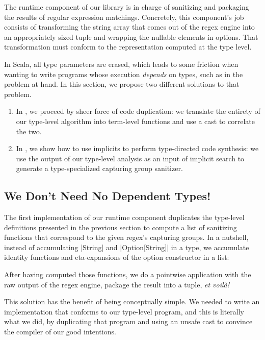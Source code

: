 The runtime component of our library is in charge of sanitizing and packaging the results of regular expression matchings.
Concretely, this component's job consists of transforming the string array that comes out of the regex engine into an appropriately sized tuple and wrapping the nullable elements in options.
That transformation must conform to the representation computed at the type level.

In Scala, all type parameters are erased, which leads to some friction when wanting to write programs whose execution \emph{depends} on types, such as in the problem at hand. In this section, we propose two different solutions to that problem.

\begin{enumerate}
  \item In , we proceed by sheer force of code duplication: we translate the entirety of our type-level algorithm into term-level functions and use a cast to correlate the two.

  \item In , we show how to use implicits to perform type-directed code synthesis: we use the output of our type-level analysis as an input of implicit search to generate a type-specialized capturing group sanitizer.
\end{enumerate}

\subsection{We Don't Need No Dependent Types!}
\label{subsec:we-ain-t-need-no-dependent-types}

The first implementation of our runtime component duplicates the type-level definitions presented in the previous section to compute a list of sanitizing functions that correspond to the given regex's capturing groups.
In a nutshell, instead of accumulating |String| and |Option[String]| in a type, we accumulate identity functions and eta-expansions of the option constructor in a list:

\regexTermLvlLoop

\noindent
After having computed those functions, we do a pointwise application with the raw output of the regex engine, package the result into a tuple, \emph{et voilà!}

\regexTransform

This solution has the benefit of being conceptually simple.
We needed to write an implementation that conforms to our type-level program, and this is literally what we did, by duplicating that program and using an unsafe cast to convince the compiler of our good intentions.

